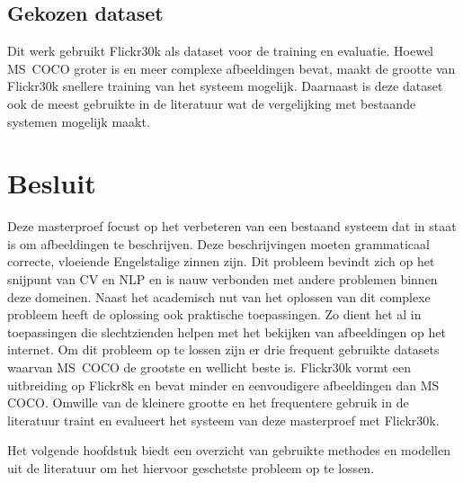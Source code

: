 \subsection{Gekozen dataset}
Dit werk gebruikt Flickr30k als dataset voor de training en evaluatie. Hoewel \mbox{MS COCO} groter is en meer complexe afbeeldingen bevat, maakt de grootte van Flickr30k snellere training van het systeem mogelijk. Daarnaast is deze dataset ook de meest gebruikte in de literatuur wat de vergelijking met bestaande systemen mogelijk maakt. 

\section{Besluit}
Deze masterproef focust op het verbeteren van een bestaand systeem dat in staat is om afbeeldingen te beschrijven. Deze beschrijvingen moeten grammaticaal correcte, vloeiende Engelstalige zinnen zijn. Dit probleem bevindt zich op het snijpunt van CV en NLP en is nauw verbonden met andere problemen binnen deze domeinen. Naast het academisch nut van het oplossen van dit complexe probleem heeft de oplossing ook praktische toepassingen. Zo dient het al in toepassingen die slechtzienden helpen met het bekijken van afbeeldingen op het internet. Om dit probleem op te lossen zijn er drie frequent gebruikte datasets waarvan \mbox{MS COCO} de grootste en wellicht beste is. Flickr30k vormt een uitbreiding op Flickr8k en bevat minder en eenvoudigere afbeeldingen dan MS COCO. Omwille van de kleinere grootte en het frequentere gebruik in de literatuur traint en evalueert het systeem van deze masterproef met Flickr30k. 

Het volgende hoofdstuk biedt een overzicht van gebruikte methodes en modellen uit de literatuur om het hiervoor geschetste probleem op te lossen.
